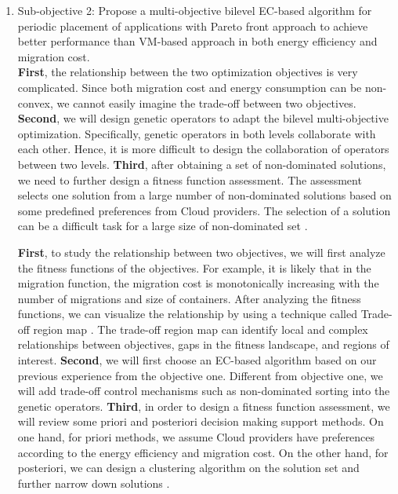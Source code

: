 \begin{enumerate}

	\item Sub-objective 2: Propose a multi-objective bilevel EC-based algorithm for periodic placement of applications with Pareto front approach to achieve better performance than VM-based approach in both energy efficiency and migration cost.\\

	 \textbf{First}, the relationship between the two optimization objectives is very complicated. Since both migration cost and energy consumption can be non-convex, we cannot easily imagine the trade-off between two objectives. \textbf{Second}, we will design genetic operators to adapt the bilevel multi-objective optimization. Specifically, genetic operators in both levels collaborate with each other. Hence, it is more difficult to design the collaboration of operators between two levels.  \textbf{Third}, after obtaining a set of non-dominated solutions, we need to further design a fitness function assessment. The assessment selects one solution from a large number of non-dominated solutions based on some predefined preferences from Cloud providers. The selection of a solution can be a difficult task for a large size of non-dominated set \cite{Zio:2012jz}. 

	 \textbf{First}, to study the relationship between two objectives, we will first analyze the fitness functions of the objectives. For example, it is likely that in the migration function, the migration cost is monotonically increasing with the number of migrations and size of containers. After analyzing the fitness functions, we can visualize the relationship by using a technique called Trade-off region map \cite{Pinheiro:2015eu}. The trade-off region map can identify local and complex relationships between objectives, gaps in the fitness landscape, and regions of interest. \textbf{Second}, we will first choose an EC-based algorithm based on our previous experience from the objective one. Different from objective one, we will add trade-off control mechanisms such as non-dominated sorting into the genetic operators. \textbf{Third}, in order to design a fitness function assessment, we will review some priori and posteriori decision making support methods. On one hand, for priori methods, we assume Cloud providers have preferences according to the energy efficiency and migration cost.  On the other hand, for posteriori, we can design a clustering algorithm on the solution set and further narrow down solutions \cite{Zio:2011iq}. 


\end{enumerate}

